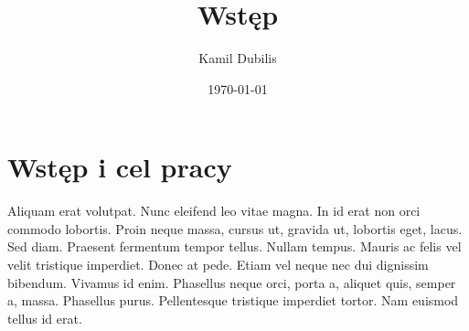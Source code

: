 \documentclass[../main.tex]{subfiles}
\author{Kamil Dubilis}
\date{\today}
\title{Wstęp}
\begin{document}
\section{Wstęp i cel pracy}
\label{sec:org04053c3}
Aliquam erat volutpat\cite{st:ism330dhcx}.  Nunc eleifend leo vitae magna.  In id erat non orci commodo lobortis.  Proin neque massa, cursus ut, gravida ut, lobortis eget, lacus.  Sed diam.  Praesent fermentum tempor tellus.  Nullam tempus.  Mauris ac felis vel velit tristique imperdiet.  Donec at pede.  Etiam vel neque nec dui dignissim bibendum.  Vivamus id enim.  Phasellus neque orci, porta a, aliquet quis, semper a, massa.  Phasellus purus.  Pellentesque tristique imperdiet tortor.  Nam euismod tellus id erat.
\end{document}
